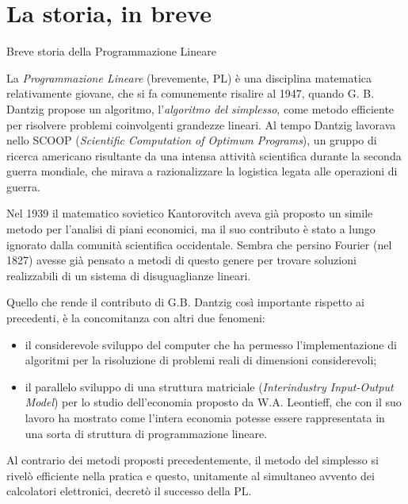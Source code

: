 \documentclass{beamer}
\begin{document}
\generatitolo

\section{La storia, in breve}

\begin{frame}[allowframebreaks]{Breve storia della Programmazione Lineare}

La \emph{Programmazione Lineare} (brevemente, PL) è una disciplina
matematica relativamente giovane, che si fa comunemente risalire al
1947, quando G. B. \mbox{Dantzig} propose un algoritmo, l'\emph{algoritmo
del simplesso}, come metodo efficiente per risolvere problemi coinvolgenti
grandezze lineari. Al tempo Dantzig lavorava nello SCOOP (\emph{Scientific
Computation of Optimum Programs}), un gruppo di ricerca americano
risultante da una intensa attività scientifica durante la seconda
guerra mondiale, che mirava a razionalizzare la logistica legata alle
operazioni di guerra.

\framebreak

Nel 1939 il matematico sovietico Kantorovitch aveva già proposto un
simile metodo per l'analisi di piani economici, ma il suo contributo
è stato a lungo ignorato dalla comunità scientifica occidentale. Sembra
che persino Fourier (nel 1827) avesse già pensato a metodi di questo
genere per trovare soluzioni realizzabili di un sistema di disuguaglianze
lineari.

\framebreak

Quello che rende il contributo di G.B. Dantzig così importante
rispetto ai precedenti, è la concomitanza con altri due fenomeni:
\begin{itemize}
\item il considerevole sviluppo del computer che ha permesso l'implementazione
di algoritmi per la risoluzione di problemi reali di dimensioni considerevoli;
\item il parallelo sviluppo di una struttura matriciale (\emph{Interindustry
Input-Output Model}) per lo studio dell'economia proposto da W.A.
Leontieff, che con il suo lavoro ha mostrato come l'intera economia
potesse essere rappresentata in una sorta di struttura di programmazione
lineare.
\end{itemize}

Al contrario dei metodi proposti precedentemente, il metodo del simplesso
si rivelò efficiente nella pratica e questo, unitamente al simultaneo
avvento dei calcolatori elettronici, decretò il successo della PL.


\end{frame}
\end{document}

